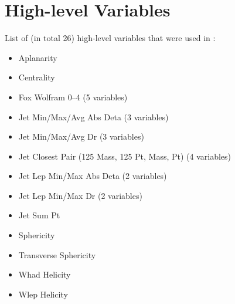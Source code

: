 \section{High-level Variables}\label{app:highlevelvars}

List of (in total 26) high-level variables that were used in :
\begin{itemize}
    \item Aplanarity
    \item Centrality
    \item Fox Wolfram 0--4 (5 variables)
    \item Jet Min/Max/Avg Abs Deta (3 variables)
    \item Jet Min/Max/Avg Dr (3 variables)
    \item Jet Closest Pair (125 Mass, 125 Pt, Mass, Pt) (4 variables)
    \item Jet Lep Min/Max Abs Deta (2 variables)
    \item Jet Lep Min/Max Dr (2 variables)
    \item Jet Sum Pt
    \item Sphericity
    \item Transverse Sphericity
    \item Whad Helicity
    \item Wlep Helicity
\end{itemize}

